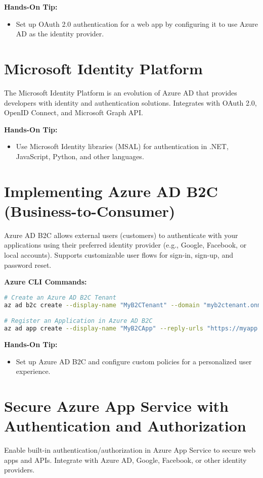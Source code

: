 \documentclass{article}
\begin{document}
\textbf{Hands-On Tip:}
\begin{itemize}
    \item Set up OAuth 2.0 authentication for a web app by configuring it to use Azure AD as the identity provider.
\end{itemize}

\section{Microsoft Identity Platform}
The Microsoft Identity Platform is an evolution of Azure AD that provides developers with identity and authentication solutions. Integrates with OAuth 2.0, OpenID Connect, and Microsoft Graph API.

\textbf{Hands-On Tip:}
\begin{itemize}
    \item Use Microsoft Identity libraries (MSAL) for authentication in .NET, JavaScript, Python, and other languages.
\end{itemize}

\section{Implementing Azure AD B2C (Business-to-Consumer)}
Azure AD B2C allows external users (customers) to authenticate with your applications using their preferred identity provider (e.g., Google, Facebook, or local accounts). Supports customizable user flows for sign-in, sign-up, and password reset.

\textbf{Azure CLI Commands:}
\begin{lstlisting}[language=bash]
# Create an Azure AD B2C Tenant
az ad b2c create --display-name "MyB2CTenant" --domain "myb2ctenant.onmicrosoft.com"

# Register an Application in Azure AD B2C
az ad app create --display-name "MyB2CApp" --reply-urls "https://myapp.example.com"
\end{lstlisting}

\textbf{Hands-On Tip:}
\begin{itemize}
    \item Set up Azure AD B2C and configure custom policies for a personalized user experience.
\end{itemize}

\section{Secure Azure App Service with Authentication and Authorization}
Enable built-in authentication/authorization in Azure App Service to secure web apps and APIs. Integrate with Azure AD, Google, Facebook, or other identity providers.
\end{document}
